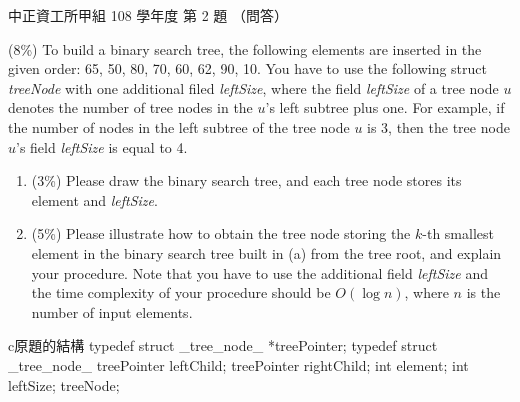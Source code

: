 \begin{pastexam}[label={px:ccu-108-swa-01}]{中正資工所甲組 108 學年度 第 2 題}
（問答）

(8\%) To build a binary search tree, the following elements are inserted in the given order:
65, 50, 80, 70, 60, 62, 90, 10. You have to use the following struct \textit{treeNode} with one
additional filed \textit{leftSize}, where the field \textit{leftSize} of a tree node $u$ denotes
the number of tree nodes in the $u$'s left subtree plus one. For example, if the number of nodes
in the left subtree of the tree node $u$ is 3, then the tree node $u$'s field \textit{leftSize} is
equal to 4.
\begin{enumerate}[label=(\alph*)]
\item (3\%) Please draw the binary search tree, and each tree node stores its element and
\textit{leftSize}.
\item (5\%) Please illustrate how to obtain the tree node storing the $k$-th smallest element in
the binary search tree built in (a) from the tree root, and explain your procedure. Note that you
have to use the additional field \textit{leftSize} and the time complexity of your procedure
should be $O(\log n)$, where $n$ is the number of input elements.
\end{enumerate}
\begin{code}{c}{原題的結構}
typedef struct _tree_node_ *treePointer;
typedef struct _tree_node_ {
    treePointer leftChild;
    treePointer rightChild;
    int element;
    int leftSize;
} treeNode;
\end{code}
\end{pastexam}

